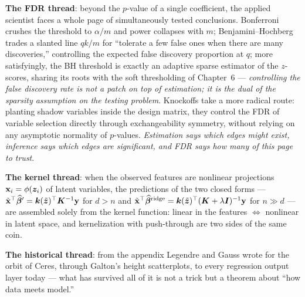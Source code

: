 \textbf{The FDR thread}: beyond the $p$-value of a single coefficient, the applied scientist faces a whole page of simultaneously tested conclusions. Bonferroni crushes the threshold to $\alpha/m$ and power collapses with $m$; Benjamini--Hochberg trades a slanted line $qk/m$ for ``tolerate a few false ones when there are many discoveries,'' controlling the expected false discovery proportion at $q$\cite{benjamini1995}; more satisfyingly, the BH threshold is exactly an adaptive sparse estimator of the $z$-scores, sharing its roots with the soft thresholding of Chapter~6 --- \textit{controlling the false discovery rate is not a patch on top of estimation; it is the dual of the sparsity assumption on the testing problem}\cite{abramovich2006}. Knockoffs take a more radical route: planting shadow variables inside the design matrix, they control the FDR of variable selection directly through exchangeability symmetry, without relying on any asymptotic normality of $p$-values\cite{barber2015}. \textit{Estimation says which edges might exist, inference says which edges are significant, and FDR says how many of this page to trust}.

\textbf{The kernel thread}: when the observed features are nonlinear projections $\mathbf{x}_i = \phi(\bm{z}_i)$ of latent variables, the predictions of the two closed forms --- $\tilde{\mathbf{x}}^\top\widehat{\bm{\beta}}' = \bm{k}(\tilde{\bm{z}})^\top \bm{K}^{-1}\mathbf{y}$ for $d > n$ and $\tilde{\mathbf{x}}^\top\widehat{\bm{\beta}}^{\mathrm{ridge}} = \bm{k}(\tilde{\bm{z}})^\top(\bm{K} + \lambda\bm{I})^{-1}\mathbf{y}$ for $n \gg d$ --- are assembled solely from the kernel function: linear in the features $\Leftrightarrow$ nonlinear in latent space, and kernelization with push-through are two sides of the same coin\cite{scholkopf2002,kimeldorf1970,rahimi2007}.

\textbf{The historical thread}: from the appendix Legendre and Gauss wrote for the orbit of Ceres\cite{legendre1805,gauss1809}, through Galton's height scatterplots\cite{galton1886}, to every regression output layer today --- what has survived all of it is not a trick but a theorem about ``how data meets model.''

